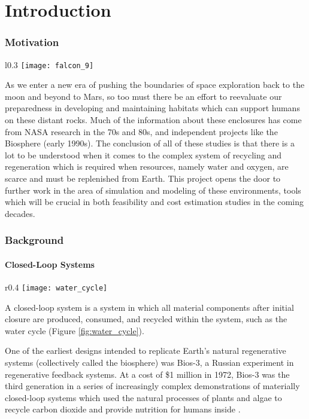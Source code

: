 \part{Introduction}
\section{Motivation}
\begin{wrapfigure}{l}{0.3\textwidth}
    \centering
    \texttt{[image: falcon\_9]}
    \caption{Falcon 9}
    \label{fig:falcon_9}
\end{wrapfigure}
As we enter a new era of pushing the boundaries of space exploration back to the moon and beyond to Mars, so too must there be an effort to reevaluate our preparedness in developing and maintaining habitats which can support humans on these distant rocks. Much of the information about these enclosures has come from NASA research in the 70s and 80s, and independent projects like the Biosphere (early 1990s). The conclusion of all of these studies is that there is a lot to be understood when it comes to the complex system of recycling and regeneration which is required when resources, namely water and oxygen, are scarce and must be replenished from Earth. This project opens the door to further work in the area of simulation and modeling of these environments, tools which will be crucial in both feasibility and cost estimation studies in the coming decades.
\section{Background}
\subsection{Closed-Loop Systems}
\begin{wrapfigure}{r}{0.4\textwidth}
    \centering
    \texttt{[image: water\_cycle]}
    \caption{The water cycle}
    \label{fig:water_cycle}
\end{wrapfigure}
A closed-loop system is a system in which all material components after initial closure are produced, consumed, and recycled within the system, such as the water cycle (Figure \ref{fig:water_cycle}). 

One of the earliest designs intended to replicate Earth’s natural regenerative systems (collectively called the biosphere) was Bios-3, a Russian experiment in regenerative feedback systems. At a cost of \$1 million in 1972, Bios-3 was the third generation in a series of increasingly complex demonstrations of materially closed-loop systems which used the natural processes of plants and algae to recycle carbon dioxide and provide nutrition for humans inside \cite{bios3}. 

